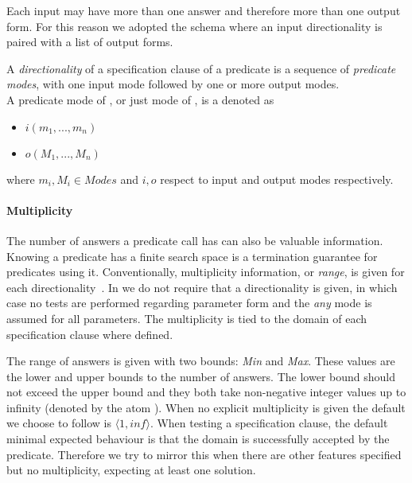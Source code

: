 Each input may have more than one answer and therefore more than one
output form.
%
For this reason we adopted the schema where an input directionality is
paired with a list of output forms.


\begin{definition}
\label{def:directionality}
A \emph{directionality} of a specification clause of a predicate
 is a sequence of \emph{predicate modes}, with one input mode
followed by one or more output modes.
\\
A predicate mode of , or just mode of , is a denoted as
\begin{itemize}
  \item $i(m_1, ..., m_n)$
  \item $o(M_1, ..., M_n)$
\end{itemize}
where $m_i,M_i \in Modes$ and $i, o$ respect to input and output modes
respectively.
\end{definition}



\paragraph{\bf Multiplicity}
The number of answers a predicate call has can also be valuable
information.
%
Knowing a predicate has a finite search space is a termination
guarantee for predicates using it.
%
Conventionally, multiplicity information, or \emph{range}, is given for
each directionality~\cite{somogyi1995mercury}.
%
In \plqc{} we do not require that a directionality is given, in which
case no tests are performed regarding parameter form and the \emph{any}
mode is assumed for all parameters.
%
The multiplicity is tied to the domain of each specification clause
where defined.


The range of answers is given with two bounds: \emph{Min} and
\emph{Max}.
%
These values are the lower and upper bounds to the number of answers.
%
The lower bound should not exceed the upper bound and they both take
non-negative integer values up to infinity (denoted by the atom
).
%
When no explicit multiplicity is given the default we choose to follow is
$\langle 1, inf \rangle $.
%
When testing a specification clause, the default minimal expected
behaviour is that the domain is successfully accepted by the predicate.
%
Therefore we try to mirror this when there are other features
specified but no multiplicity, expecting at least one solution.


